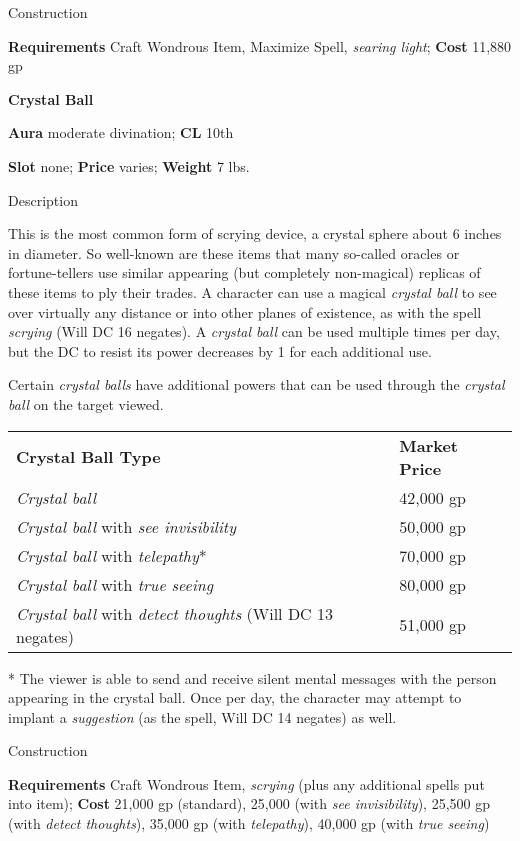 Construction
				
\textbf{Requirements }Craft Wondrous Item, Maximize Spell, \textit{searing light}; \textbf{Cost} 11,880 gp
				
\textbf{Crystal Ball}
				
\textbf{Aura} moderate divination;\textbf{ CL }10th
				
\textbf{Slot} none; \textbf{Price} varies; \textbf{Weight} 7 lbs.
				
Description
				
This is the most common form of scrying device, a crystal sphere about 6 inches in diameter. So well-known are these items that many so-called oracles or fortune-tellers use similar appearing (but completely non-magical) replicas of these items to ply their trades. A character can use a magical \textit{crystal ball} to see over virtually any distance or into other planes of existence, as with the spell \textit{scrying }(Will DC 16 negates). A \textit{crystal ball} can be used multiple times per day, but the DC to resist its power decreases by 1 for each additional use.
				
Certain \textit{crystal balls }have additional powers that can be used through the \textit{crystal ball }on the target viewed.
\begin{tabular}{ll}
\textbf{Crystal Ball Type} & \textbf{Market Price}\\
\textit{Crystal ball} & 42,000 gp\\
\textit{Crystal ball} with \textit{see invisibility} & 50,000 gp\\
\textit{Crystal ball} with \textit{telepathy}* & 70,000 gp\\
\textit{Crystal ball} with \textit{true seeing} & 80,000 gp\\
\textit{Crystal ball} with \textit{detect thoughts} (Will DC 13 negates) & 51,000 gp\\
\end{tabular}
* The viewer is able to send and receive silent mental messages with the person appearing in the crystal ball. Once per day, the character may attempt to implant a \textit{suggestion} (as the spell, Will DC 14 negates) as well.

Construction
				
\textbf{Requirements} Craft Wondrous Item, \textit{scrying} (plus any additional spells put into item); \textbf{Cost }21,000 gp (standard), 25,000 (with \textit{see invisibility}), 25,500 gp (with \textit{detect thoughts}), 35,000 gp (with \textit{telepathy}), 40,000 gp (with \textit{true seeing})
				
